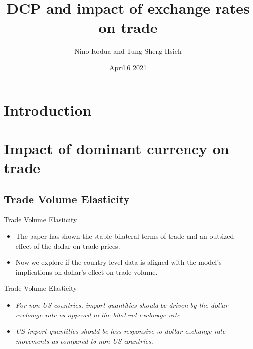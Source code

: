 \documentclass{beamer}
\title{DCP and impact of exchange rates on trade}
\author{Nino Kodua and Tung-Sheng Hsieh}
\institute{Johns Hopkins University}
\date{April 6 2021}
\begin{document}
\maketitle

\section{Introduction}
\section{Impact of dominant currency on trade}
\subsection{Trade Volume Elasticity}
\begin{frame}{Trade Volume Elasticity}
    \begin{itemize}
        \item The paper has shown the stable bilateral terms-of-trade and an outsized effect of the dollar on trade prices.
        \item Now we explore if the country-level data is aligned with the model's implications on dollar's effect on trade volume. 
    \end{itemize}
\end{frame}
\begin{frame}{Trade Volume Elasticity}
    \begin{itemize}
            \item \emph{For non-US countries, import quantities should be driven by the dollar exchange rate as opposed to the bilateral exchange rate. }
            \item \emph{US import quantities should be less responsive to dollar exchange rate movements as compared to non-US countries.}
        \end{itemize}
\end{frame}
\end{document}
